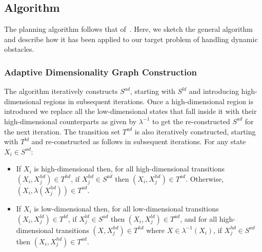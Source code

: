\subsection{Algorithm}
The planning algorithm follows that of~\cite{gochev2011path}. Here, we sketch the general algorithm and describe how it has been applied to our target problem of handling dynamic obstacles. 

\subsubsection{Adaptive Dimensionality Graph Construction}

The algorithm iteratively constructs $S^{ad}$, starting with $S^{ld}$ and introducing high-dimensional regions in subsequent iterations. Once a high-dimensional region is introduced we replace all the low-dimensional states that fall inside it with their high-dimensional counterparts as given by $\lambda^{-1}$ to get the re-constructed $S^{ad}$ for the next iteration. The transition set $T^{ad}$ is also iteratively constructed, starting with $T^{ld}$ and re-constructed as follows in subsequent iterations. 
For any state $X_i \in S^{ad}$:
\begin{itemize}
\item If $X_i$ is high-dimensional then, for all high-dimensional transitions $(X_i,X_j^{hd}) \in T^{hd}$, if $X_j^{hd} \in S^{ad}$ then $(X_i,X_j^{hd}) \in T^{ad}$. Otherwise, $(X_i, \lambda(X_j^{hd})) \in T^{ad}$.
\item If $X_i$ is low-dimensional then, for all low-dimensional transitions $(X_i, X_j^{ld}) \in T^{ld}$, if $X_j^{ld} \in S^{ad}$ then $(X_i, X_j^{ld}) \in T^{ad}$, and for all high-dimensional transitions $(X, X_j^{hd}) \in T^{hd}$ where $X \in \lambda^{-1}(X_i)$, if $X_j^{hd} \in S^{ad}$ then $(X_i, X_j^{hd}) \in T^{ad}$.
\end{itemize}

